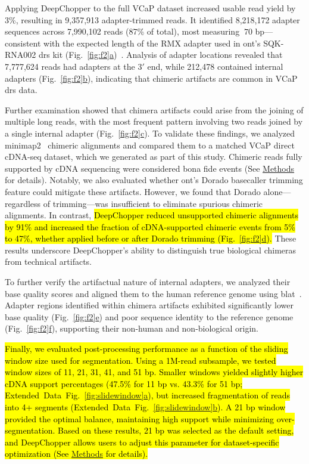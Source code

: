 \documentclass[pdflatex,sn-nature, lineno]{sn-jnl}%
\newcommand{\figref}[2]{Fig.~\hyperref[#1]{\ref*{#1}#2}}
\newcommand{\edfigref}[2]{Extended Data Fig.~\hyperref[#1]{\ref*{#1}#2}}
\begin{document}
Applying DeepChopper to the full VCaP dataset increased usable read yield by 3\%, resulting in 9,357,913 adapter-trimmed reads. It identified 8,218,172 adapter sequences across 7,990,102 reads (87\% of total), most measuring $~70$ bp—consistent with the expected length of the RMX adapter used in \gls{ont}'s SQK-RNA002 \gls{drs} kit (\figref{fig:f2}{a})~\cite{nano2017tech}. Analysis of adapter locations revealed that 7,777,624 reads had adapters at the $3'$ end, while 212,478 contained internal adapters (\figref{fig:f2}{b}), indicating that chimeric artifacts are common in VCaP \gls{drs} data.

Further examination showed that chimera artifacts could arise from the joining of multiple long reads, with the most frequent pattern involving two reads joined by a single internal adapter (\figref{fig:f2}{c}). To validate these findings, we analyzed minimap2~\cite{li2018minimap2} chimeric alignments and compared them to a matched VCaP direct cDNA-seq dataset, which we generated as part of this study. Chimeric reads fully supported by cDNA sequencing were considered bona fide events (See \hyperref[sec:methods]{Methods} for details). Notably, we also evaluated whether \gls{ont}'s Dorado basecaller trimming feature could mitigate these artifacts.
However, we found that Dorado alone—regardless of trimming—was insufficient to eliminate spurious chimeric alignments.
In contrast, \hl{DeepChopper reduced unsupported chimeric alignments by 91\% and increased the fraction of cDNA-supported chimeric events from 5\% to 47\%, whether applied before or after Dorado trimming (\mbox{\figref{fig:f2}{d}}).}
These results underscore DeepChopper’s ability to distinguish true biological chimeras from technical artifacts.

To further verify the artifactual nature of internal adapters, we analyzed their base quality scores and aligned them to the human reference genome using \gls{blat}~\cite{kent2002blat}. Adapter regions identified within chimera artifacts exhibited significantly lower base quality (\figref{fig:f2}{e}) and poor sequence identity to the reference genome (\figref{fig:f2}{f}), supporting their non-human and non-biological origin.

\hl{Finally, we evaluated post-processing performance as a function of the sliding window size used for segmentation. Using a 1M-read subsample, we tested window sizes of 11, 21, 31, 41, and 51 bp. Smaller windows yielded slightly higher cDNA support percentages (47.5\% for 11 bp vs. 43.3\% for 51 bp; \mbox{\edfigref{fig:slidewindow}{a}}), but increased fragmentation of reads into 4+ segments (\mbox{\edfigref{fig:slidewindow}{b}}). A 21 bp window provided the optimal balance, maintaining high support while minimizing over-segmentation. Based on these results, 21 bp was selected as the default setting, and DeepChopper allows users to adjust this parameter for dataset-specific optimization (See \mbox{\hyperref[sec:methods]{Methods}} for details).}
\end{document}
